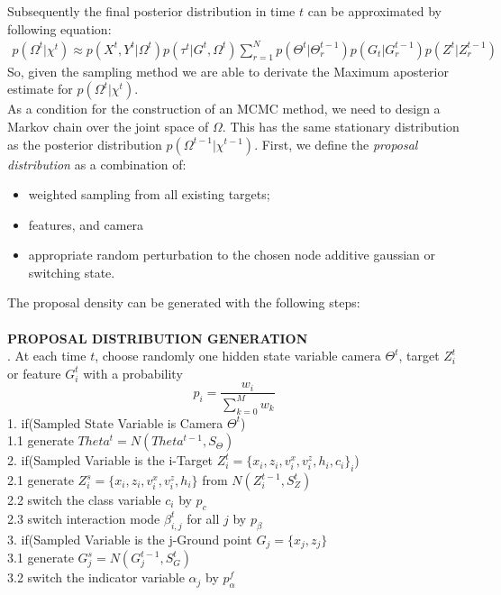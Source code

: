 Subsequently the final posterior distribution in time $t$ can be approximated by following equation:
\begin{eqnarray} \label{eqn: Posterior Distribution MTT3}
p(\Omega^{t} |\chi^{t}) \approx  p(X^{t}, Y^t |\Omega^{t}) p(\tau^{t} | G^t ,\Omega^{t}) 
\sum_{r=1}^{N} p(\Theta^{t} | \Theta^{t-1}_r) p(G_t |G^{t-1}_r) p(Z^t |Z^{t-1}_r)
\end{eqnarray}
So, given the sampling method we are able to derivate the Maximum aposterior estimate for $p(\Omega^{t} |\chi^{t})$.\\
As a condition for the construction of an MCMC method, we need to design a Markov chain over the joint space of $\Omega$. 
This has the same stationary distribution as the posterior distribution 
$p(\Omega^{t-1} |\chi^{t-1})$. 
First, we define the \textit{proposal distribution} as a combination of:
\begin{itemize}
\item weighted sampling from all existing targets;
\item features, and camera 
\item appropriate random perturbation to the chosen node additive gaussian or switching state.
\end{itemize}
The proposal density can be generated with the following steps: 
\\
\\
{\bf PROPOSAL DISTRIBUTION GENERATION}\\[.4cm]
{. \hspace*{0.2cm} At each time $t$, choose randomly one hidden state variable camera  $\Theta^t$, target $Z_i^t$ or feature $G_i^t$ with a probability
$$
  p_i=\frac{w_i}{\sum_{k=0}^{M} w_k}
$$
1.  \hspace*{0.2cm} if(Sampled State Variable is Camera $\Theta^t$) \\
1.1 \hspace*{0.4cm} generate $Theta^t=N(Theta^{t-1},S_{\Theta})$\\
2.  \hspace*{0.2cm} if(Sampled Variable is the i-Target $Z_i^t=\{x_i, z_i, v_i^x , v_i^z , h_i,c_i \}_i$) \\
2.1 \hspace*{0.4cm} generate $Z_i^s=\{x_i, z_i, v_i^x , v_i^z , h_i \}$ from $N(Z_i^{t-1},S_{Z}^t)$ \\
2.2 \hspace*{0.4cm} switch the class variable $c_i$ by $p_c$ \\
2.3 \hspace*{0.4cm} switch interaction mode $\beta_{i,j}^t$ for all $j$ by $p_{\beta}$\\
3.  \hspace*{0.2cm} if(Sampled Variable is the j-Ground point $G_j=\{x_j, z_j\}$ \\
3.1 \hspace*{0.4cm} generate $G_j^s=N(G_j^{t-1},S_G^t)$ \\
3.2 \hspace*{0.4cm} switch the indicator variable $\alpha_j$ by $p_{\alpha}^f$
}\\[.4cm]
